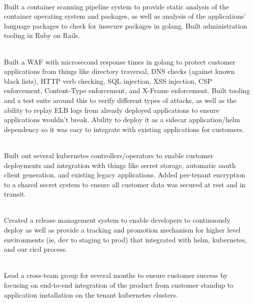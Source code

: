 \documentclass[a4paper,11pt,sans]{article}
\begin{document}
\hspace{5pt} \\

Built a container scanning pipeline system to provide static analysis of the container operating system and packages, as well as analysis of the applications' language packages to check for insecure packages in golang. Built administration tooling in Ruby on Rails. 

\hspace{5pt} \\

Built a WAF with microsecond response times in golang to protect customer applications from things like directory traversal, DNS checks (against known black lists), HTTP verb checking, SQL injection, XSS injection, CSP enforcement, Content-Type enforcement, and X-Frame enforcement. Built tooling and a test suite around this to verify different types of attacks, as well as the ability to replay ELB logs from already deployed applications to ensure applications wouldn't break. Ability to deploy it as a sidecar application/helm dependency so it was easy to integrate with existing applications for customers.

\hspace{5pt} \\

Built out several kubernetes controllers/operators to enable customer deployments and integration with things like secret storage, automatic oauth client generation, and existing legacy applications. Added per-tenant encryption to a shared secret system to ensure all customer data was secured at rest and in transit. 

\hspace{5pt} \\

Created a release management system to enable developers to continuously deploy as well as provide a tracking and promotion mechanism for higher level environments (ie, dev to staging to prod) that integrated with helm, kubernetes, and our cicd process. 

\hspace{5pt} \\

Lead a cross-team group for several months to ensure customer success by focusing on end-to-end integration of the product from customer standup to application installation on the tenant kubernetes clusters. 


\hspace{5pt} \\
\hspace{5pt} \\
\end{document}

